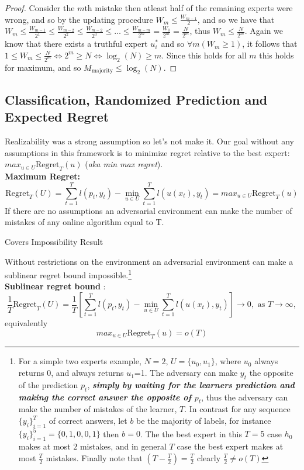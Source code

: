 \documentclass[11pt]{article}
\theoremstyle{quest}
\begin{document}
\begin{proof}Consider the $m$th mistake then atleast half of the remaining experts were wrong, and so by the updating procedure $W_m\le \frac{W_{m-1}}{2}$, and so we have that $W_m\le \frac{W_{m-1}}{2^1}\le \frac{W_{m-2}}{2^2} \le \frac{W_{m-2}}{2^3}\le \dots \le \frac{W_{m-m}}{2^m} =  \frac{W_{0}}{2^m} = \frac{N}{2^m}$, thus $W_m \le \frac{N}{2^m}$. Again we know that there exists a truthful expert $u_i^{*}$  and so $\forall m(W_m \ge 1)$, it follows that $1\le W_m \le \frac{N}{2^m} \iff 2^m \ge N \iff \log_2(N) \ge m.$ Since this holds for all $m$ this holds for maximum, and so $M_\text{majority}\le \log_2(N)$. \end{proof}

\subsection{Classification, Randomized Prediction and Expected Regret}
Realizability was a strong assumption so let's not make it. Our goal without any assumptions in this framework is to minimize regret relative to the best expert: $max_{u\in U} \text{Regret}_T(u)$ (\textit{aka min max regret}). \\
\textbf{Maximum Regret:}
\begin{equation} \label{eq:regret}
\text{Regret}_T(U) = \sum_{t=1}^T l(p_t,y_t) - \min_{u\in U}\sum_{t=1}^T l(u(x_t),y_t) = max_{u\in U} \text{Regret}_T(u)
\end{equation} If there are no assumptions an adversarial environment can make the number of mistakes of any online algorithm equal to T.
\begin{tcolorbox}
\begin{center}Covers Impossibility Result \end{center}
Without restrictions on the environment an adversarial environment can make a sublinear regret bound impossible.\footnote{For a simple  two experts  example, $N=2$, $U=\{u_0,u_1\}$, where $u_0$ always returns 0, and always returns $u_1$=1. The adversary can make $y_t$ the opposite of the prediction $p_t$, \textbf{\textit{simply by waiting for the learners prediction and making the correct answer the opposite of $p_t$}}, thus the adversary can make the number of mistakes of the learner, $T$. In contrast for any sequence $\{y_i\}_{i=1}^T$ of correct answers, let $b$ be the majority of labels, for instance $\{y_i\}_{i=1}^5 = \{0,1,0,0,1\}$ then $b = 0$. The the best expert in this $T=5$ case $h_0$ makes at most $2$ mistakes, and in general $T$ case the best expert makes at most $\frac{T}{2}$ mistakes. Finally note that $(T-\frac{T}{2}) = \frac{T}{2}$ clearly $\frac{T}{2} \neq o(T)$}\\ \textbf{Sublinear regret bound }:
\begin{equation} \label{eq:sublinear}
\frac{1}{T}\text{Regret}_T(U) =\frac{1}{T} [\sum_{t=1}^T l(p_t,y_t) - \min_{u\in U}\sum_{t=1}^T l(u(x_t),y_t)] \rightarrow 0, \text{ as } T\rightarrow \infty,
\end{equation} equivalently 
\begin{equation*}  
 max_{u\in U} \text{Regret}_T(u) = o(T)
\end{equation*}

\end{tcolorbox}
\end{document}
